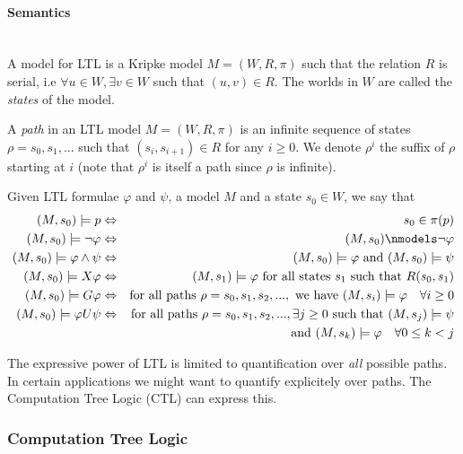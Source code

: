 \documentclass{article}
\newenvironment{definition}[1][Definition]{\begin{trivlist}
\item[\hskip \labelsep {\bfseries #1}]}{\end{trivlist}}
\newcommand{\myparagraph}[1]{\paragraph{#1}\mbox{}\\}
\begin{document}
\myparagraph{Semantics} 

A model for LTL is a Kripke model $M = (W, R, \pi)$ such that the relation $R$ is serial, i.e $\forall u \in W,  \exists v \in W$ such that $(u, v) \in R$.
The worlds in $W$ are called the \textit{states} of the model. 

\begin{definition} 
A \textit{path} in an LTL model $M = (W, R, \pi)$ is an infinite sequence of states $\rho = s_0, s_1, ...$ such that $(s_i, s_{i+1}) \in R$ for any $i \geq 0$.
We denote $\rho^i$ the suffix of $\rho$ starting at $i$ (note that $\rho^i$ is itself a path since $\rho$ is infinite).
\end{definition}


\begin{definition}
Given LTL formulae $\varphi$ and $\psi$, a model $M$ and a state $s_0 \in W$, we say that
\begin{eqnarray*}
(M, s_0) \models p &\Leftrightarrow& s_0 \in \pi(p) \\  
(M, s_0) \models \lnot \varphi &\Leftrightarrow& (M, s_0) \nmodels \lnot \varphi\\
(M, s_0) \models \varphi \land \psi &\Leftrightarrow& (M, s_0) \models \varphi \mbox{ and  } (M, s_0) \models \psi \\
(M, s_0) \models X\varphi &\Leftrightarrow& (M, s_1) \models \varphi \mbox{  for all states } s_1 \mbox{ such that } R(s_0, s_1)\\
(M, s_0) \models G\varphi &\Leftrightarrow& \mbox{for all paths } \rho = s_0, s_1, s_2, ... , \mbox{ we have } (M, s_i) \models \varphi \quad \forall i \geq 0 \\
(M, s_0) \models \varphi U\psi &\Leftrightarrow& \mbox{for all paths } \rho = s_0, s_1, s_2, ..., \exists j \geq 0 \mbox{ such that }  (M, s_j) \models \psi \\ && \mbox{ and }  (M, s_k) \models \varphi \quad \forall 0 \leq k < j
\end{eqnarray*}

\end{definition}

The expressive power of LTL is limited to quantification over \textit{all} possible paths. In certain applications we might want to quantify explicitely over paths. The Computation Tree Logic (CTL) can express this. 

\subsubsection{Computation Tree Logic} 
\end{document}
